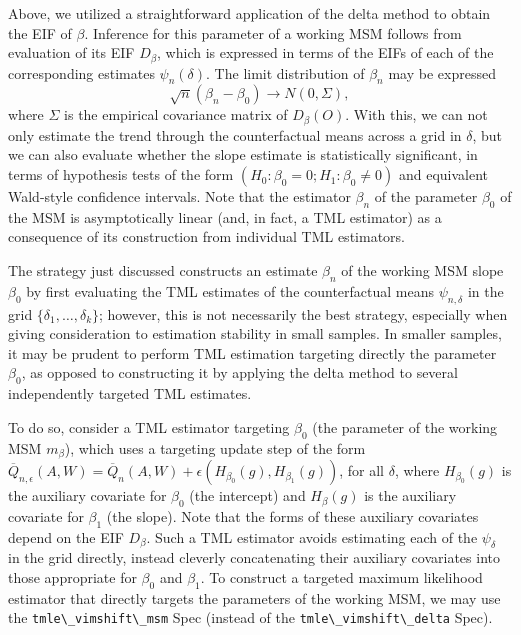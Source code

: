 \documentclass[
  12pt, krantz2,
]{krantz}
\newcommand{\passthrough}[1]{#1}
\newcommand{\1}{\mathbbm{1}}
\theoremstyle{definition}
\theoremstyle{definition}
\theoremstyle{definition}
\theoremstyle{definition}
\theoremstyle{remark}
\begin{document}
Above, we utilized a straightforward application of the delta method to obtain
the EIF of \(\beta\). Inference for this parameter of a working MSM follows from
evaluation of its EIF \(D_{\beta}\), which is expressed in terms of the EIFs of
each of the corresponding estimates \(\psi_n(\delta)\). The limit distribution of
\(\beta_n\) may be expressed \[\sqrt{n}(\beta_n - \beta_0) \to N(0, \Sigma),\]
where \(\Sigma\) is the empirical covariance matrix of \(D_{\beta}(O)\). With this,
we can not only estimate the trend through the counterfactual means across a
grid in \(\delta\), but we can also evaluate whether the slope estimate is
statistically significant, in terms of hypothesis tests of the form \((H_0: \beta_0 = 0; H_1: \beta_0 \neq 0)\) and equivalent Wald-style confidence
intervals. Note that the estimator \(\beta_n\) of the parameter \(\beta_0\) of the
MSM is asymptotically linear (and, in fact, a TML estimator) as a consequence of
its construction from individual TML estimators.

The strategy just discussed constructs an estimate \(\beta_n\) of the working MSM
slope \(\beta_0\) by first evaluating the TML estimates of the counterfactual
means \(\psi_{n,\delta}\) in the grid \(\{\delta_1, \ldots, \delta_k\}\); however,
this is not necessarily the best strategy, especially when giving consideration
to estimation stability in small samples. In smaller samples, it may be prudent
to perform TML estimation targeting directly the parameter \(\beta_0\), as opposed
to constructing it by applying the delta method to several independently
targeted TML estimates.

To do so, consider a TML estimator targeting \(\beta_0\) (the parameter of the
working MSM \(m_{\beta}\)), which uses a targeting update step of the form
\(\overline{Q}_{n, \epsilon}(A,W) = \overline{Q}_n(A,W) + \epsilon (H_{\beta_0}(g), H_{\beta_1}(g))\), for all \(\delta\), where \(H_{\beta_0}(g)\) is
the auxiliary covariate for \(\beta_0\) (the intercept) and \(H_{\beta}(g)\) is the
auxiliary covariate for \(\beta_1\) (the slope). Note that the forms of these
auxiliary covariates depend on the EIF \(D_{\beta}\). Such a TML estimator avoids
estimating each of the \(\psi_{\delta}\) in the grid directly, instead cleverly
concatenating their auxiliary covariates into those appropriate for \(\beta_0\)
and \(\beta_1\). To construct a targeted maximum likelihood estimator that
directly targets the parameters of the working MSM, we may use the
\passthrough{\lstinline!tmle\_vimshift\_msm!} Spec (instead of the \passthrough{\lstinline!tmle\_vimshift\_delta!} Spec).
\end{document}
